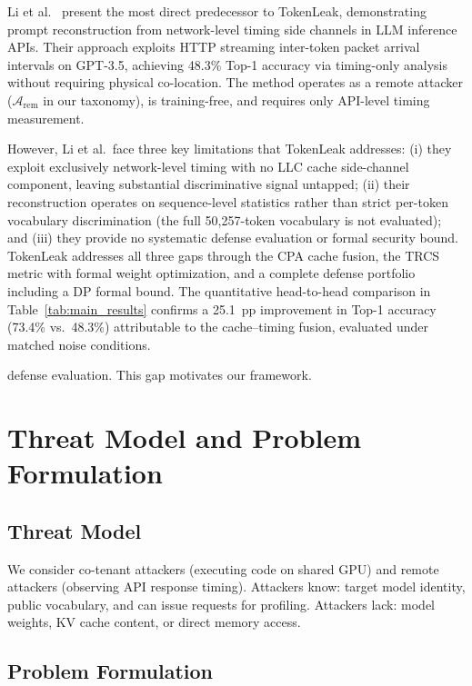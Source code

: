 \documentclass[journal,10pt,twocolumn]{IEEEtran}
\begin{document}
Li et al.~\cite{li2024prompt} present the most direct predecessor to
TokenLeak, demonstrating prompt reconstruction from network-level
timing side channels in LLM inference APIs. Their approach exploits
HTTP streaming inter-token packet arrival intervals on GPT-3.5,
achieving 48.3\% Top-1 accuracy via timing-only analysis without
requiring physical co-location. The method operates as a remote
attacker ($\mathcal{A}_{\mathrm{rem}}$ in our taxonomy), is
training-free, and requires only API-level timing measurement.

However, Li et al.\ face three key limitations that TokenLeak
addresses: (i) they exploit exclusively network-level timing with
no LLC cache side-channel component, leaving substantial
discriminative signal untapped; (ii) their reconstruction operates
on sequence-level statistics rather than strict per-token vocabulary
discrimination (the full 50{,}257-token vocabulary is not evaluated);
and (iii) they provide no systematic defense evaluation or formal
security bound. TokenLeak addresses all three gaps through the CPA
cache fusion, the TRCS metric with formal weight optimization, and a
complete defense portfolio including a DP formal bound. The
quantitative head-to-head comparison in
Table~\ref{tab:main_results} confirms a 25.1~pp improvement in
Top-1 accuracy (73.4\% vs.\ 48.3\%) attributable to the cache--timing
fusion, evaluated under matched noise conditions.

defense evaluation. This gap motivates our framework.

\section{Threat Model and Problem Formulation}
\label{sec:threat}

\subsection{Threat Model}

We consider co-tenant attackers (executing code on shared GPU) and remote attackers
(observing API response timing). Attackers know: target model identity, public vocabulary,
and can issue requests for profiling. Attackers lack: model weights, KV cache content, or direct memory access.

\subsection{Problem Formulation}
\end{document}
